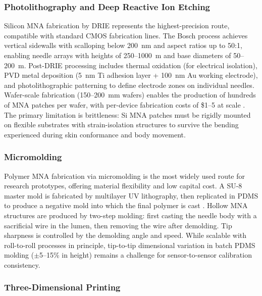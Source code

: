 \documentclass[review,1p]{elsarticle}
\begin{document}
\subsubsection{Photolithography and Deep Reactive Ion Etching}

Silicon MNA fabrication by DRIE represents the highest-precision route, compatible with standard CMOS fabrication lines. The Bosch process achieves vertical sidewalls with scalloping below 200~nm and aspect ratios up to 50:1, enabling needle arrays with heights of 250--1000~\textmu{}m and base diameters of 50--200~\textmu{}m. Post-DRIE processing includes thermal oxidation (for electrical isolation), PVD metal deposition (5~nm Ti adhesion layer + 100~nm Au working electrode), and photolithographic patterning to define electrode zones on individual needles. Wafer-scale fabrication (150--200~mm wafers) enables the production of hundreds of MNA patches per wafer, with per-device fabrication costs of \$1--5 at scale \cite{Dervisevic2021}. The primary limitation is brittleness: Si MNA patches must be rigidly mounted on flexible substrates with strain-isolation structures to survive the bending experienced during skin conformance and body movement.

\subsubsection{Micromolding}

Polymer MNA fabrication via micromolding is the most widely used route for research prototypes, offering material flexibility and low capital cost. A SU-8 master mold is fabricated by multilayer UV lithography, then replicated in PDMS to produce a negative mold into which the final polymer is cast \cite{Parrilla2022}. Hollow MNA structures are produced by two-step molding: first casting the needle body with a sacrificial wire in the lumen, then removing the wire after demolding. Tip sharpness is controlled by the demolding angle and speed. While scalable with roll-to-roll processes in principle, tip-to-tip dimensional variation in batch PDMS molding ($\pm$5--15\% in height) remains a challenge for sensor-to-sensor calibration consistency.

\subsubsection{Three-Dimensional Printing}
\end{document}

